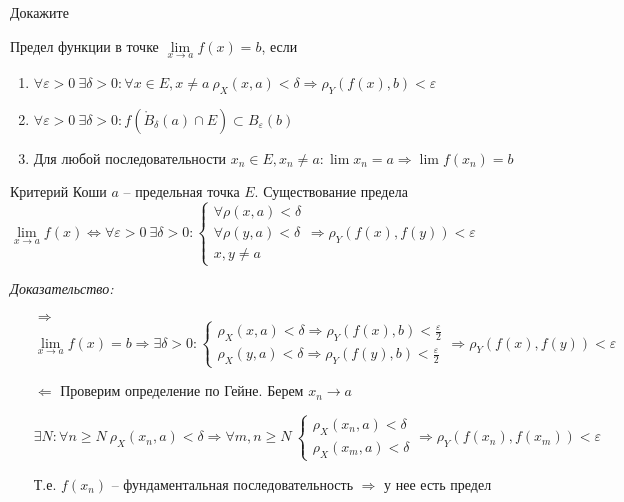 \documentclass[12pt]{article}
\begin{document}
\begin{Exercise}{}
    Докажите
\end{Exercise}

\begin{defin}{Предел функции в точке}
    $\lim\limits_{x \to a} f(x) = b$, если
    
    \begin{enumerate}
        \item $\forall \varepsilon > 0\ \exists \delta > 0 : \forall x \in E, x \neq a\ \rho_X(x, a) < \delta \Rightarrow \rho_Y(f(x), b) < \varepsilon$
        \item $\forall \varepsilon > 0\ \exists \delta > 0 : f(\mathring{B}_\delta(a) \cap E) \subset B_\varepsilon(b)$
        \item Для любой последовательности $x_n \in E, x_n \neq a : \lim x_n = a \Rightarrow \lim f(x_n) = b$
    \end{enumerate}
\end{defin}

\begin{theo}{Критерий Коши}
    $a$ -- предельная точка $E$. Существование предела $\lim\limits_{x \to a} f(x) \Leftrightarrow \forall \varepsilon > 0\ \exists \delta > 0 : \begin{cases}
        \forall \rho(x, a) < \delta \\
        \forall \rho(y, a) < \delta \\
        x, y \neq a 
    \end{cases} \Rightarrow \rho_Y(f(x), f(y)) < \varepsilon$
\end{theo}

\textit{Доказательство:}

\begin{itemize}
    \item[$\Rightarrow$] $\lim\limits_{x \to a} f(x) = b \Rightarrow \exists \delta > 0 : \begin{cases}
        \rho_X(x, a) < \delta  \Rightarrow \rho_Y(f(x), b) < \frac{\varepsilon}{2} \\
        \rho_X(y, a) < \delta  \Rightarrow \rho_Y(f(y), b) < \frac{\varepsilon}{2}
    \end{cases} \Rightarrow \rho_Y(f(x), f(y)) < \varepsilon$

    \item[$\Leftarrow$] Проверим определение по Гейне. Берем $x_n \to a$
    
    $\exists N : \forall n \geq N\ \rho_X(x_n, a) < \delta \Rightarrow \forall m, n \geq N\ \begin{cases}
        \rho_X(x_n, a) < \delta \\
        \rho_X(x_m, a) < \delta 
    \end{cases} \Rightarrow \rho_Y(f(x_n), f(x_m)) < \varepsilon$

    Т.е. $f(x_n)$ -- фундаментальная последовательность $\Rightarrow$ у нее есть предел
\end{itemize}
\end{document}
